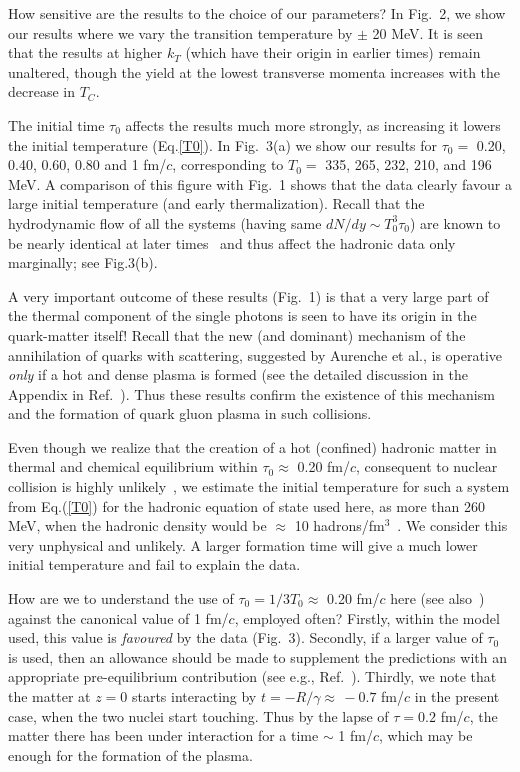 How sensitive are the results to the choice of our parameters?
In Fig.~2, we show our results where we vary the transition temperature
by $\pm$ 20 MeV. It is seen that the results at higher $k_T$
(which have their origin in earlier times) remain unaltered, though the
yield at the lowest transverse momenta increases with the decrease in
$T_C$.

The initial time $\tau_0$ affects the results much more strongly, as
increasing it lowers the initial temperature (Eq.\ref{T0}). In Fig.~3(a) we show
our results for $\tau_0=$ 0.20, 0.40, 0.60, 0.80 and 1 fm/$c$, corresponding to
$T_0=$ 335, 265, 232, 210, and 196  MeV.  A comparison of this figure with
 Fig.~1 shows that the data  clearly favour
a large initial temperature (and early thermalization). Recall that the
hydrodynamic flow of all the systems (having same $dN/dy\sim T_0^3 \tau_0$)
 are known to be nearly identical at later
times~\cite{hydro} and thus affect the hadronic 
data only marginally; see Fig.3(b).

A very important outcome of these results (Fig.~1) is that a very 
large part of the thermal component
of the single photons is seen to have its origin in the quark-matter
itself!
Recall that the new (and dominant) mechanism of the annihilation of
quarks with scattering, suggested by Aurenche et al., is operative
{\em only} if a hot and dense plasma is formed (see the 
detailed discussion in the Appendix in Ref.~\cite{pat}).
Thus these results confirm the existence of this mechanism and the 
formation of quark gluon plasma in such collisions.

Even though we realize that the creation of a hot (confined)
hadronic matter in thermal 
and chemical equilibrium within $\tau_0\approx$ 0.20 fm/$c$, consequent
to nuclear collision is highly unlikely~\cite{kap}, we estimate the
initial temperature for such a system  from Eq.(\ref{T0}) 
for the hadronic equation of state used here, as more than
260 MeV, when the hadronic density would be $\approx$ 10
 hadrons/fm$^3$~\cite{crs}. We consider this very unphysical and unlikely.
A larger formation time will  give  a much lower initial
temperature and fail to explain the data.

How are we to understand the
use of $\tau_0 =1/3T_0\approx $ 0.20 fm/$c$ here (see also~\cite{kms}) against 
the  canonical value of 1 fm/$c$, employed often? Firstly, 
within the model used, this value is {\em favoured} by the data (Fig.~3).
  Secondly, if a larger value
of $\tau_0$ is used, then an allowance should be made to supplement the
predictions with an appropriate pre-equilibrium contribution
(see e.g., Ref.~\cite{pcmphot2}).
Thirdly, we note that the matter at $z=0$ 
starts interacting by $t=-R/\gamma\approx\, -0.7$ fm/$c$ in the
present case, when the two nuclei start touching. Thus by the lapse of
$\tau=0.2$ fm/$c$, the matter there has been under interaction 
for a time $\sim$ 1 fm/$c$, which may be enough for the formation 
of the plasma.

